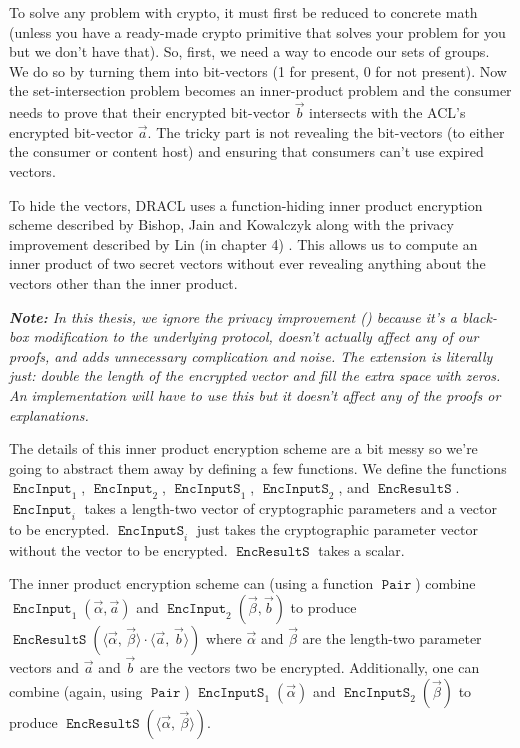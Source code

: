 \documentclass[pdftex,12pt,a4papaer,twoside,notitlepage]{report}
\newcommand{\note}[1]{\vspace{1em} \begin{spacing}{1}\textit{\textbf{Note:} #1}\end{spacing}\vspace{1em}}
\newcommand{\iprod}[2]{\langle #1,\,#2\rangle}
\DeclareMathOperator{\ein}{\mathtt{EncInput}}
\DeclareMathOperator{\eins}{\mathtt{EncInputS}}
\DeclareMathOperator{\eouts}{\mathtt{EncResultS}}
\DeclareMathOperator{\pair}{\mathtt{Pair}}
\begin{document}
To solve any problem with crypto, it must first be reduced to concrete math
(unless you have a ready-made crypto primitive that solves your problem for you
but we don't have that). So, first, we need a way to encode our sets of groups.
We do so by turning them into bit-vectors (1 for present, 0 for not present).
Now the set-intersection problem becomes an inner-product problem and the
consumer needs to prove that their encrypted bit-vector $\vec{b}$ intersects
with the ACL's encrypted bit-vector $\vec{a}$. The tricky part is not revealing
the bit-vectors (to either the consumer or content host) and ensuring that
consumers can't use expired vectors.

To hide the vectors, DRACL uses a function-hiding inner product encryption
scheme described by Bishop, Jain and Kowalczyk \cite{inner-product} along with
the privacy improvement described by Lin (in chapter 4)
\cite{inner-product-ext}. This allows us to compute an inner product of two
secret vectors without ever revealing anything about the vectors other than the
inner product.

\note{In this thesis, we ignore the privacy improvement
  (\cite{inner-product-ext}) because it's a black-box modification to the
  underlying protocol, doesn't actually affect any of our proofs, and adds
  unnecessary complication and noise. The extension is literally just: double
  the length of the encrypted vector and fill the extra space with zeros. An
  implementation will have to use this but it doesn't affect any of the proofs
  or explanations.}

\newcommand{\Ap}{\vec{\alpha}}
\newcommand{\Bp}{\vec{\beta}}
\newcommand{\ABp}{\iprod{\Ap}{\Bp}}

\sloppy The details of this inner product encryption scheme are a bit messy so
we're going to abstract them away by defining a few functions. We define the
functions $\ein_1$, $\ein_2$, $\eins_1$, $\eins_2$, and $\eouts$. $\ein_i$ takes
a length-two vector of cryptographic parameters and a vector to be encrypted.
$\eins_i$ just takes the cryptographic parameter vector without the vector to be
encrypted. $\eouts$ takes a scalar.

\sloppy The inner product encryption scheme can (using a function $\pair$)
combine $\ein_1(\Ap, \vec{a})$ and \allowbreak$\ein_2(\Bp, \vec{b})$ to produce
$\eouts(\ABp\cdot\iprod{\vec{a}}{\vec{b}})$ where $\Ap$ and $\Bp$ are the
length-two parameter vectors and $\vec{a}$ and $\vec{b}$ are the vectors two be
encrypted. Additionally, one can combine (again, using $\pair$) $\eins_1(\Ap)$
and $\eins_2(\Bp)$ to produce $\eouts(\ABp)$.
\end{document}
